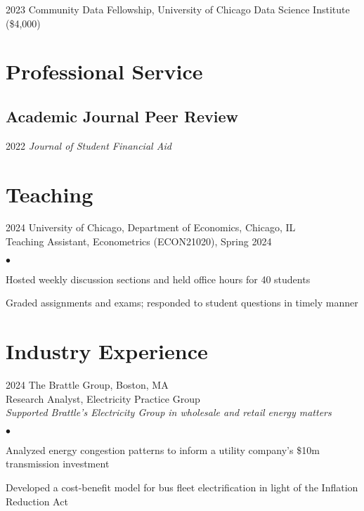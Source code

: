 \documentclass[11pt,letterpaper]{report}
\newenvironment{list2}{
  \begin{list}{\tiny$\bullet$}{%
      \setlength{\itemsep}{0in}
      \setlength{\parsep}{0in} \setlength{\parskip}{0in}
      \setlength{\topsep}{0in} \setlength{\partopsep}{0in} 
      \setlength{\leftmargin}{0.2in}}}{\end{list}}
\begin{document}
\begin{tablist}
  \item[2023] \tab{} Community Data Fellowship, University of Chicago Data Science Institute (\$4,000)
\end{tablist}

\section*{Professional Service}

\subsection*{Academic Journal Peer Review}
\begin{tablist}
  \item[2022] \tab{} \emph{Journal of Student Financial Aid}
\end{tablist}

\section*{Teaching}

\begin{tablist}
\item[2024] \tab{}University of Chicago, Department of Economics, Chicago, IL\\ 
Teaching Assistant, Econometrics (ECON21020), Spring 2024\\ 
\vspace*{.05in}  
\begin{list2}
\item Hosted weekly discussion sections and held office hours for 40 students 
\item Graded assignments and exams; responded to student questions in timely manner  
\end{list2}
\end{tablist} 

\section*{Industry Experience}

\begin{tablist}
\item[2024] \tab{}The Brattle Group, Boston, MA\\ 
Research Analyst, Electricity Practice Group\\ 
\emph{Supported Brattle's Electricity Group in wholesale and retail energy matters}

\vspace*{.05in}  
\begin{list2}
\item Analyzed energy congestion patterns to inform a utility company's \$10m transmission investment 
\item Developed a cost-benefit model for bus fleet electrification in light of the Inflation Reduction Act 
\end{list2}
\end{tablist}
\end{document}
